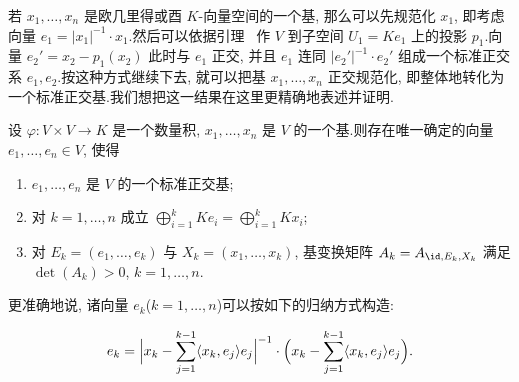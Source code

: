 若 $x_1, \ldots, x_n$ 是欧几里得或酉 $K$-向量空间的一个基, 那么可以先规范化 $x_1$, 即考虑向量 $e_1 = |x_1|^{-1} \cdot x_1$.然后可以依据引理~ 作 $V$ 到子空间 $U_1 = K e_1$ 上的投影 $p_1$.向量 $e_2' = x_2 - p_1(x_2)$ 此时与 $e_1$ 正交, 并且 $e_1$ 连同 $|e_2'|^{-1} \cdot e_2'$ 组成一个标准正交系 $e_1, e_2$.按这种方式继续下去, 就可以把基 $x_1, \ldots, x_n$ 正交规范化, 即整体地转化为一个标准正交基.我们想把这一结果在这里更精确地表述并证明.

\begin{theorem}[施密特正交规范化]\label{thm:7.2.5}
设 $\varphi \colon V \times V \longrightarrow K$ 是一个数量积, $x_1, \ldots, x_n$ 是 $V$ 的一个基.则存在唯一确定的向量 $e_1, \ldots, e_n \in V$, 使得
\begin{enumerate}
\item[(i)] $e_1, \ldots, e_n$ 是 $V$ 的一个标准正交基;
\item[(ii)] 对 $k = 1, \ldots, n$ 成立 $\bigoplus_{i = 1}^{k} K e_i = \bigoplus_{i = 1}^{k} K x_i$;
\item[(iii)] 对 $E_k = (e_1, \ldots, e_k)$ 与 $X_k = (x_1, \ldots, x_k)$, 基变换矩阵 $A_k = A_{\id, E_k, X_k}$ 满足 $\det(A_k) > 0$, $k = 1, \ldots, n$.
\end{enumerate}

更准确地说, 诸向量 $e_k$($k = 1, \ldots, n$)可以按如下的归纳方式构造:

\[
e_k = \Bigl|x_k - \sum_{j = 1}^{k-1} \langle x_k, e_j \rangle e_j\Bigr|^{-1} \cdot \Bigl(x_k - \sum_{j = 1}^{k-1} \langle x_k, e_j \rangle e_j\Bigr)\text{.}
\]
\end{theorem}

